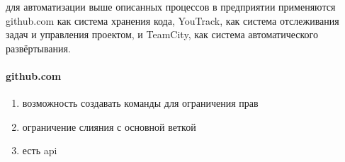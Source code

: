 \documentclass{article}
\begin{document}

для автоматизации выше описанных процессов в предприятии применяются github.com как система хранения кода,
YouTrack, как система отслеживания задач и управления проектом, и TeamCity, как система автоматического развёртывания.

\paragraph{github.com}
\begin{enumerate}
    \item{возможность создавать команды для ограничения прав}
    \item{ограничение слияния с основной веткой}
    \item{есть api}
\end{enumerate}
\end{document}
